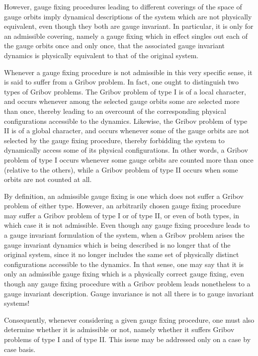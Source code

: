 \documentclass[a4paper,11pt]{article}
\begin{document}
\vspace{5pt}

However, gauge fixing procedures leading to different coverings of the
space of gauge orbits imply dynamical descriptions of the system which
are not physically equivalent, even though they both are gauge invariant.
In particular, it is only for an admissible covering, namely a gauge
fixing which in effect singles out each of the gauge orbits once and only
once, that the associated gauge invariant dynamics is physically
equivalent to that of the original system.

Whenever a gauge fixing procedure is not admissible in this very specific
sense, it is said to suffer from a Gribov problem.\cite{Gribov} In fact, 
one ought to distinguish two types of Gribov problems.\cite{JG1} 
The Gribov problem of type I
is of a local character, and occurs whenever among the selected gauge orbits
some are selected more than once, thereby leading to an overcount of
the cor\-res\-pon\-ding physical configurations accessible to the dynamics.
Likewise, the Gribov problem of type II is of a global character, and
occurs whenever some of the gauge orbits are not selected by the gauge fixing
procedure, thereby forbidding the system to dynamically access some of its
physical configurations. In other words, a Gribov problem of type I occurs
whenever some gauge orbits are counted more than once (relative to the
others), while a Gribov problem of type II occurs when some orbits are
not counted at all. 

By definition, an admissible gauge fixing is one which does not suffer
a Gribov problem of either type. However, an arbitrarily chosen gauge 
fixing procedure may suffer a Gribov problem of type I or of type II,
or even of both types, in which case it is not admissible. Even though
any gauge fixing procedure leads to a gauge invariant formulation of the
system, when a Gribov problem arises the gauge invariant dynamics which is 
being described is no longer that of the original system, since it no longer
includes the same set of physically distinct configurations accessible
to the dynamics. In that sense, one may say that it is only an admissible
gauge fixing which is a physically correct gauge fixing, even though
any gauge fixing procedure with a Gribov problem leads nonetheless
to a gauge invariant description. Gauge invariance is not all there is
to gauge invariant systems!

Consequently, whenever considering a given gauge fixing procedure,
one must also determine whether it is admissible or not, namely
whether it suffers Gribov problems of type I and of type II. This issue
may be addressed only on a case by case basis.
\end{document}
